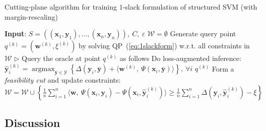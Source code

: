 \documentclass[9pt]{extarticle}
\DeclareMathOperator*{\argmax}{argmax}
\begin{document}
\begin{algorithm}[htbp]
\caption{Cutting-plane algorithm for training $1$-slack formulation of structured SVM (with margin-rescaling)}
\label{alg:1slacktrain}
\begin{algorithmic}[1]
\STATE \textbf{Input}: $S = \left( (\mathbf{x}_1, \mathbf{y}_1), \dots, (\mathbf{x}_n, \mathbf{y}_n) \right),~ C,~ \varepsilon$
\STATE $\mathcal{W} = \emptyset$
{}
    \STATE Generate query point $q^{(k)} = (\mathbf{w}^{(k)}, \xi^{(k)})$ by solving QP~(\ref{eq:1slackform}) w.r.t. all constraints in $\mathcal{W}$
    \STATE $\triangleright$ Query the oracle at point $q^{(k)}$ as follows
    \STATE Do loss-augmented inference:~
           $\hat{\mathbf{y}}_i^{(k)} = \argmax_{\bar{\mathbf{y}} \in \mathcal{Y}} \left\{ \Delta(\mathbf{y}_i, \bar{\mathbf{y}}) + 
            \langle \mathbf{w}^{(k)},~ \Psi(\mathbf{x}_i, \bar{\mathbf{y}}) \rangle \right\},~ \forall i$
        \RETURN $q^{(k)}$
    \ELSE
        \STATE Form a \emph{feasibility cut} and update constraints:~
               $\mathcal{W} = \mathcal{W} \cup \left\{ 
                \frac{1}{n} \sum_{i=1}^n \langle \mathbf{w},~ \Psi(\mathbf{x}_i, \mathbf{y}_i) - \Psi(\mathbf{x}_i, \hat{\mathbf{y}}_i^{(k)}) \rangle \ge 
                \frac{1}{n} \sum_{i=1}^n \Delta(\mathbf{y}_i, \hat{\mathbf{y}}_i^{(k)}) - \xi \right\}$
    \ENDIF
\ENDFOR
\end{algorithmic}
\end{algorithm}


\subsection{Discussion}
\label{sec:ssvm_discussion}
\end{document}
